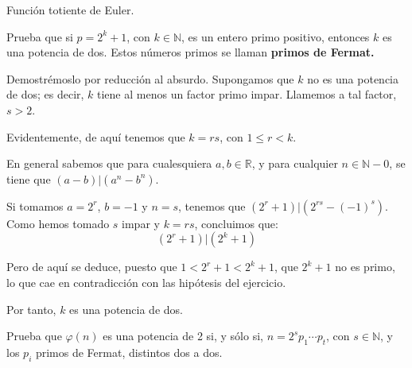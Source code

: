 \documentclass[a4paper, 11pt]{article}
\begin{document}
  \maketitle
  \begin{ejercicio}
      Función totiente de Euler.
  \end{ejercicio}

  \begin{apartado}
      Prueba que si $p = 2^k + 1$, con $k\in\mathbb{N}$, es un entero primo positivo, entonces $k$ es una potencia de dos. Estos números primos se llaman \bf{primos de Fermat}.
  \end{apartado}

  \begin{solucion}
      Demostrémoslo por reducción al absurdo. Supongamos que $k$ no es una potencia de dos; es decir, $k$ tiene al menos un factor primo impar. Llamemos a tal factor, $s>2$.

      Evidentemente, de aquí tenemos que $k = rs$, con $1 \leq r < k$.

      En general sabemos que para cualesquiera $a,b\in\mathbb{R}$, y para cualquier $n\in\mathbb{N}-{0}$, se tiene que $(a-b) \vert (a^n - b^n)$.

      Si tomamos $a = 2^r$, $b = -1$ y $n = s$, tenemos que $(2^r + 1) \vert (2^{rs} - (-1)^s)$. Como hemos tomado $s$ impar y $k = rs$, concluimos que:
      \[
      (2^r + 1) \vert (2^k + 1)
      \]

      Pero de aquí se deduce, puesto que $1 < 2^r + 1 < 2^k + 1$, que $2^k + 1$ no es primo, lo que cae en contradicción con las hipótesis del ejercicio.

      Por tanto, $k$ es una potencia de dos.
  \end{solucion}

  \begin{apartado}
      Prueba que $\varphi(n)$ es una potencia de 2 si, y sólo si, $n = 2^s p_1 \cdots p_t$, con $s\in\mathbb{N}$, y los $p_i$ primos de Fermat, distintos dos a dos.
  \end{apartado}
\end{document}
